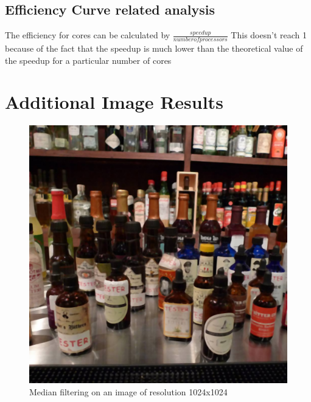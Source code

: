 \documentclass[runningheads, a4paper, oribibl]{llncs}
\begin{document}
\subsection{Efficiency Curve related analysis}
The efficiency for cores can be calculated by $\frac{speedup}{number of processors}$ This doesn't reach 1 because of the fact that the speedup is much lower than the theoretical value of the speedup for a particular number of cores

\section{Additional Image Results}

\begin{figure}[h!]
    \centering
    \includegraphics[scale = 0.4]{q1/1024.png}
    \caption{Median filtering on an image of resolution 1024x1024}
    \label{fig:1}
\end{figure}
\end{document}
